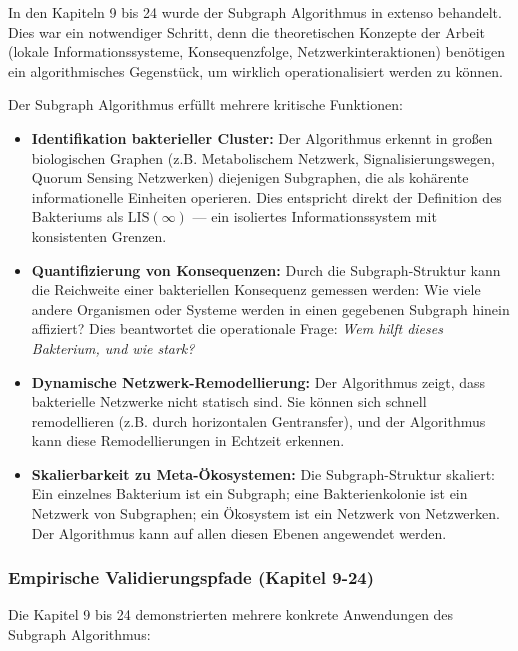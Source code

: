 \documentclass[a4paper,12pt]{article}
\theoremstyle{definition}
\begin{document}
In den Kapiteln 9 bis 24 wurde der Subgraph Algorithmus in extenso behandelt. Dies war ein notwendiger Schritt, denn die theoretischen Konzepte der Arbeit (lokale Informationssysteme, Konsequenzfolge, Netzwerkinteraktionen) benötigen ein algorithmisches Gegenstück, um wirklich operationalisiert werden zu können.

Der Subgraph Algorithmus erfüllt mehrere kritische Funktionen:

\begin{itemize}
    \item \textbf{Identifikation bakterieller Cluster:} Der Algorithmus erkennt in großen biologischen Graphen (z.B. Metabolischem Netzwerk, Signalisierungswegen, Quorum Sensing Netzwerken) diejenigen Subgraphen, die als kohärente informationelle Einheiten operieren. Dies entspricht direkt der Definition des Bakteriums als $\text{LIS}(\infty)$ --- ein isoliertes Informationssystem mit konsistenten Grenzen.
    
    \item \textbf{Quantifizierung von Konsequenzen:} Durch die Subgraph-Struktur kann die Reichweite einer bakteriellen Konsequenz gemessen werden: Wie viele andere Organismen oder Systeme werden in einen gegebenen Subgraph hinein affiziert? Dies beantwortet die operationale Frage: \textit{Wem hilft dieses Bakterium, und wie stark?}
    
    \item \textbf{Dynamische Netzwerk-Remodellierung:} Der Algorithmus zeigt, dass bakterielle Netzwerke nicht statisch sind. Sie können sich schnell remodellieren (z.B. durch horizontalen Gentransfer), und der Algorithmus kann diese Remodellierungen in Echtzeit erkennen.
    
    \item \textbf{Skalierbarkeit zu Meta-Ökosystemen:} Die Subgraph-Struktur skaliert: Ein einzelnes Bakterium ist ein Subgraph; eine Bakterienkolonie ist ein Netzwerk von Subgraphen; ein Ökosystem ist ein Netzwerk von Netzwerken. Der Algorithmus kann auf allen diesen Ebenen angewendet werden.
\end{itemize}

\subsubsection{Empirische Validierungspfade (Kapitel 9-24)}

Die Kapitel 9 bis 24 demonstrierten mehrere konkrete Anwendungen des Subgraph Algorithmus:
\end{document}
